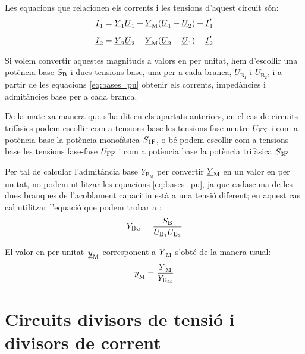 \begin{center}
    
    \label{pic:pu_ym}
\end{center}

Les equacions que relacionen els corrents i les tensions d'aquest circuit són:
\begin{subequations}
\begin{align}
    \underline{I}_1  &= \underline{Y}_1 \underline{U}_1 +  \underline{Y}_\mathrm{M}(\underline{U}_1-\underline{U}_2)  + \underline{I}'_1   \\[2mm]
    \underline{I}_2  &= \underline{Y}_2 \underline{U}_2 +  \underline{Y}_\mathrm{M}(\underline{U}_2-\underline{U}_1)  + \underline{I}'_2
\end{align}
\end{subequations}

Si volem convertir aquestes magnituds a valors en per unitat, hem d'escollir  una potència base $S_\mathrm{B}$ i dues tensions base, una  per a cada branca, $U_{\text{B}_1}$ i  $U_{\text{B}_2}$, i a partir de les equacions \eqref{eq:bases_pu} obtenir els corrents, impedàncies i admitàncies base per a cada branca.

De la mateixa manera que s'ha dit en els apartats anteriors, en el cas de circuits trifàsics podem escollir com a tensions base les tensions fase-neutre $U_\mathrm{FN}$ i com a potència base la potència  monofàsica $S_\mathrm{1F}$, o bé podem escollir com a tensions base les tensions fase-fase $U_\mathrm{FF}$ i com a potència base la potència trifàsica $S_\mathrm{3F}$.


Per tal de  calcular l'admitància base $Y_{\text{B}_\text{M}}$ per convertir $\underline{Y}_\mathrm{M}$ en un valor en per unitat, no podem utilitzar les equacions \eqref{eq:bases_pu}, ja que cadascuna de les dues branques de l'acoblament capacitiu està a una tensió diferent; en aquest cas cal utilitzar l'equació que podem trobar a \cite{TLE}:
\begin{equation}
    Y_{\text{B}_\text{M}} = \frac{S_\mathrm{B}}{U_{\text{B}_1} U_{\text{B}_2}}
\end{equation}

El valor en per unitat\ $\underline{y}_\mathrm{M}$ corresponent a $\underline{Y}_\mathrm{M}$ s'obté de la manera usual:
\begin{equation}
    \underline{y}_\mathrm{M} = \frac{\underline{Y}_\mathrm{M}}{Y_{\text{B}_\text{M}}}
\end{equation}


\section{Circuits divisors de tensió i divisors de corrent}\label{sec:div_tens_corr}

